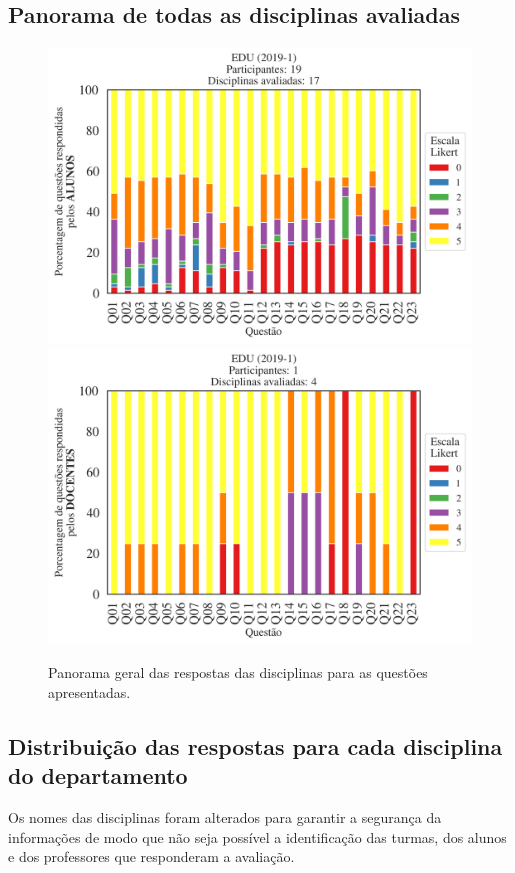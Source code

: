 \documentclass[a4paper,10pt]{article}
\begin{document}
\subsection{Panorama de todas as disciplinas avaliadas}
\begin{figure}[h]
\centering
\includegraphics[width=0.85\linewidth]{analise_geral_departamento_EDU_ALUNO_TURMA.png}
\includegraphics[width=0.85\linewidth]{analise_geral_departamento_EDU_DOCENTE_TURMA.png}
\caption{\label{fig:analise_geral_departamento}            Panorama geral das respostas das disciplinas para as questões apresentadas.}
\end{figure}
\subsection{Distribuição das respostas para cada disciplina do departamento}

Os nomes das disciplinas foram alterados para garantir a segurança da informações de modo que não seja possível a identificação das turmas, dos alunos  e dos professores que responderam a avaliação.
\end{document}
